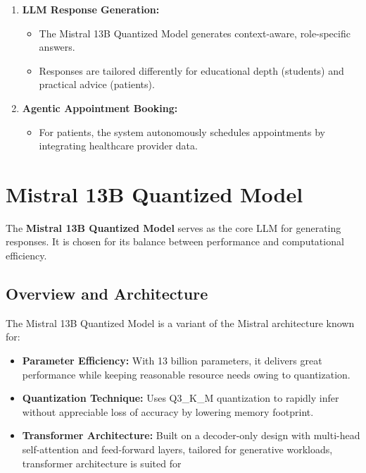 \begin{enumerate}[itemsep=2em]
  \item \textbf{LLM Response Generation:}
    \begin{itemize}
        \item The Mistral 13B Quantized Model generates context-aware, role-specific answers.
        \item Responses are tailored differently for educational depth (students) and practical advice (patients).
    \end{itemize}
    \vspace{2cm}
  \item \textbf{Agentic Appointment Booking:}
    \begin{itemize}
        \item For patients, the system autonomously schedules appointments by integrating healthcare provider data.
    \end{itemize}
\end{enumerate}

\section{Mistral 13B Quantized Model}
\label{sec:mistral_model}

The \textbf{Mistral 13B Quantized Model} serves as the core LLM for generating responses. It is chosen for its balance between performance and computational efficiency.

\subsection{Overview and Architecture}
\label{subsec:mistral_overview}
The Mistral 13B Quantized Model is a variant of the Mistral architecture known for:
\begin{itemize}[itemsep=2em]
    \item \textbf{Parameter Efficiency:} With 13 billion parameters, it delivers great performance while keeping reasonable resource needs owing to quantization.
    \item \textbf{Quantization Technique:} Uses Q3\_K\_M quantization to rapidly infer without appreciable loss of accuracy by lowering memory footprint.
    \item \textbf{Transformer Architecture:} Built on a decoder-only design with multi-head self-attention and feed-forward layers, tailored for generative workloads, transformer architecture is suited for
\end{itemize}

